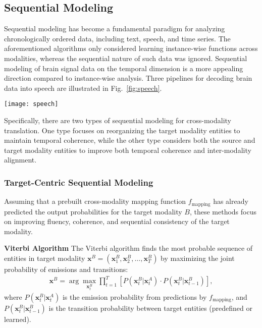\documentclass[journal]{IEEEtran}
\begin{document}
\subsection{Sequential Modeling} \label{sect:sequential}

Sequential modeling has become a fundamental paradigm for analyzing chronologically ordered data, including text, speech, and time series. The aforementioned algorithms only considered learning instance-wise functions across modalities, whereas the sequential nature of such data was ignored. Sequential modeling of brain signal data on the temporal dimension is a more appealing direction compared to instance-wise analysis. Three pipelines for decoding brain data into speech are illustrated in Fig.~\ref{fig:speech}.

\begin{figure*}[htpb] \centering
\texttt{[image: speech]}
\caption{Three pipelines for decoding brain recordings into speech and their respective sequential modeling components. The majority of works decode brain data into sentences, either through direct sequence-to-sequence neural networks, or first map to discrete entities of language and then reorganize them. An alternative pipeline directly synthesizes speech waveform, through first mapping to mel-spectrogram, then using vocoder for audio generation.} \label{fig:speech}
\end{figure*}

Specifically, there are two types of sequential modeling for cross-modality translation. One type focuses on reorganizing the target modality entities to maintain temporal coherence, while the other type considers both the source and target modality entities to improve both temporal coherence and inter-modality alignment.

\subsubsection{Target-Centric Sequential Modeling}

Assuming that a prebuilt cross-modality mapping function $f_{\text{mapping}}$ has already predicted the output probabilities for the target modality $B$, these methods focus on improving fluency, coherence, and sequential consistency of the target modality.

\textbf{Viterbi Algorithm} The Viterbi algorithm finds the most probable sequence of entities in target modality $\mathbf{x}^{B} = (\mathbf{x}_1^{B}, \mathbf{x}_2^{B}, \ldots, \mathbf{x}_T^{B})$ by maximizing the joint probability of emissions and transitions:
\begin{align}
\mathbf{x}^{B} = \arg \max_{\mathbf{x}_t^{B}} \prod_{t=1}^T \left[ P(\mathbf{x}_t^{B} | \mathbf{x}_t^{A}) \cdot P(\mathbf{x}_t^{B} | \mathbf{x}_{t-1}^{B}) \right],
\end{align}
where $P(\mathbf{x}_t^{B} | \mathbf{x}_t^{A})$ is the emission probability from predictions by $f_{\text{mapping}}$, and $P(\mathbf{x}_t^{B} | \mathbf{x}_{t-1}^{B})$ is the transition probability between target entities (predefined or learned).
\end{document}
